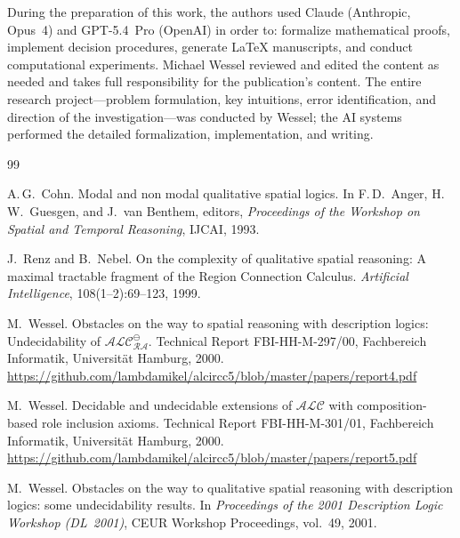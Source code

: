 \documentclass[
]{ceurart}
\theoremstyle{definition}
\newcommand{\ALC}{\ensuremath{\mathcal{ALC}}}
\begin{document}
During the preparation of this work, the authors used Claude (Anthropic,
Opus~4) and GPT-5.4~Pro (OpenAI) in order to: formalize mathematical
proofs, implement decision procedures, generate LaTeX manuscripts,
and conduct computational experiments.  Michael Wessel reviewed and
edited the content as needed and takes full responsibility for the
publication's content.  The entire research project---problem
formulation, key intuitions, error identification, and direction of
the investigation---was conducted by Wessel; the AI systems performed
the detailed formalization, implementation, and writing.

\begin{thebibliography}{99}


A.\,G.\ Cohn.
\newblock Modal and non modal qualitative spatial logics.
\newblock In F.\,D.\ Anger, H.\,W.\ Guesgen, and J.\ van Benthem, editors,
  \emph{Proceedings of the Workshop on Spatial and Temporal Reasoning},
  IJCAI, 1993.

J.\ Renz and B.\ Nebel.
\newblock On the complexity of qualitative spatial reasoning:
  A maximal tractable fragment of the Region Connection Calculus.
\newblock \emph{Artificial Intelligence}, 108(1--2):69--123, 1999.

M.\ Wessel.
\newblock Obstacles on the way to spatial reasoning with description
  logics: Undecidability of $\ALC_{\mathcal{RA}}^\ominus$.
\newblock Technical Report FBI-HH-M-297/00, Fachbereich Informatik,
  Universit\"at Hamburg, 2000.
\newblock \url{https://github.com/lambdamikel/alcircc5/blob/master/papers/report4.pdf}

M.\ Wessel.
\newblock Decidable and undecidable extensions of $\ALC$ with
  composition-based role inclusion axioms.
\newblock Technical Report FBI-HH-M-301/01, Fachbereich Informatik,
  Universit\"at Hamburg, 2000.
\newblock \url{https://github.com/lambdamikel/alcircc5/blob/master/papers/report5.pdf}

M.\ Wessel.
\newblock Obstacles on the way to qualitative spatial reasoning with
  description logics: some undecidability results.
\newblock In \emph{Proceedings of the 2001 Description Logic Workshop
  (DL~2001)}, CEUR Workshop Proceedings, vol.~49, 2001.


\end{thebibliography}
\end{document}

